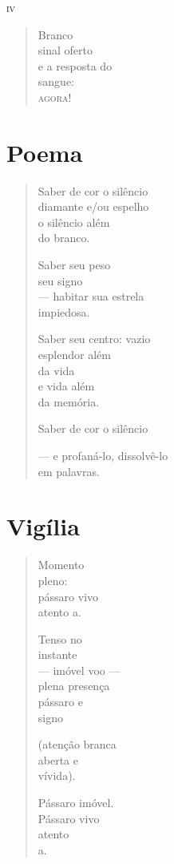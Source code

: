 \medskip
\textsc{iv}

\begin{verse}
Branco\\
sinal oferto\\
e a resposta do\\
sangue:\\
\textsc{agora!}
\end{verse}


\chapter{Poema}

\begin{verse}
Saber de cor o silêncio\\
diamante e/ou espelho\\
o silêncio além\\
do branco.

Saber seu peso\\
seu signo\\
--- habitar sua estrela\\
\quad impiedosa.

Saber seu centro: vazio\\
esplendor além\\
da vida\\
e vida além\\
da memória.

Saber de cor o silêncio

--- e profaná-lo, dissolvê-lo\\
\qquad\qquad\qquad em palavras.
\end{verse}

\chapter{Vigília}

\begin{verse}
Momento\\
\qquad\qquad pleno:\\
pássaro vivo\\
atento a.

Tenso no\\
\qquad\qquad instante\\
--- imóvel voo ---\\
plena presença\\
pássaro e\\
\qquad\qquad signo

(atenção branca\\
aberta e\\
\qquad\qquad vívida).

Pássaro imóvel.\\
Pássaro vivo\\
atento\\
a.
\end{verse}

